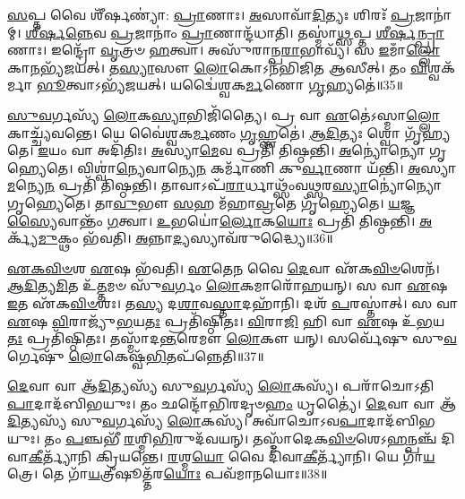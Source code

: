 \-\ul{𑌸}\-𑌪𑍍𑌤 𑌵𑍈 𑌶𑍀᳴𑌰𑍍\mbox{}\-\ul{𑌷}\-𑌣𑍍𑌯𑌾॑: \ul{𑌪𑍍𑌰𑌾}\-𑌣𑌾𑌃।
\-\ul{𑌅}\-𑌸𑌾𑌵𑌾᳴\-\ul{𑌦𑌿}\-𑌤𑍍𑌯𑌃 𑌶𑌿𑌰𑌃᳴ \ul{𑌪𑍍𑌰}\-𑌜𑌾𑌨𑌾॑𑌮𑍍।
\-\ul{𑌶𑍀}\-\-\ul{𑌰𑍍}\-𑌷\-\ul{𑌨𑍍𑌨𑍇}\-𑌵 \ul{𑌪𑍍𑌰}\-𑌜𑌾𑌨𑌾𑌂॑ \ul{𑌪𑍍𑌰𑌾}\-𑌣𑌾𑌨𑍍𑌦᳴𑌧𑌾𑌤𑌿।
𑌤𑌸𑍍𑌮𑌾॑\-\ul{𑌥𑍍𑌸}\-𑌪𑍍𑌤 \ul{𑌶𑍀}\-\-\ul{𑌰𑍍}\-𑌷\-\ul{𑌨𑍍𑌪𑍍𑌰𑌾}\-𑌣𑌾𑌃।
𑌇𑌨𑍍𑌦𑍍𑌰𑍋᳴ \ul{𑌵𑍃}\-𑌤𑍍𑌰𑍞 \ul{𑌹}\-𑌤𑍍𑌵𑌾।
𑌅𑌸𑍁᳴𑌰𑌾𑌨𑍍𑌪\-\ul{𑌰𑌾}\-𑌭𑌾𑌵𑍍𑌯᳴।
𑌸 \ul{𑌇}\-𑌮𑌾𑌁\-\ul{𑌲𑍍𑌲𑍋}\-𑌕𑌾\-\ul{𑌨}\-𑌭𑍍𑌯᳴𑌜𑌯𑌤𑍍।
𑌤\-\ul{𑌸𑍍𑌯𑌾}\-𑌸𑍗 \ul{𑌲𑍋}\-𑌕𑍋\-𑌽𑌨᳴𑌭𑌿𑌜𑌿𑌤 𑌆𑌸𑍀𑌤𑍍।
𑌤𑌂 \ul{𑌵𑌿}\-𑌶𑍍𑌵𑌕᳴𑌰𑍍𑌮𑌾 \ul{𑌭𑍂}\-𑌤𑍍𑌵𑌾\-𑌽𑌭𑍍𑌯᳴𑌜𑌯𑌤𑍍।
𑌯𑌦𑍍𑌵𑍈॑𑌶𑍍𑌵𑌕\-\ul{𑌰𑍍𑌮}\-𑌣𑍋 \ul{𑌗𑍃}\-𑌹𑍍𑌯𑌤𑍇॑॥35॥

\-\ul{𑌸𑍁}\-\-\ul{𑌵}\-𑌰𑍍𑌗𑌸𑍍𑌯᳴ \ul{𑌲𑍋}\-𑌕\-\ul{𑌸𑍍𑌯𑌾}\-𑌭𑌿𑌜𑌿᳴𑌤𑍍𑌯𑍈।
𑌪𑍍𑌰 𑌵𑌾 \ul{𑌏}\-𑌤𑍇॑\-𑌽𑌸𑍍𑌮𑌾\-\ul{𑌲𑍍𑌲𑍋}\-𑌕𑌾𑌚𑍍𑌚𑍍𑌯᳴𑌵𑌨𑍍𑌤𑍇।
𑌯𑍇 𑌵𑍈॑𑌶𑍍𑌵𑌕\-\ul{𑌰𑍍𑌮}\-𑌣𑌂 \ul{𑌗𑍃}\-𑌹𑍍𑌣𑌤𑍇॑।
\-\ul{𑌆}\-\-\ul{𑌦𑌿}\-𑌤𑍍𑌯𑌃 𑌶𑍍𑌵𑍋 𑌗𑍃᳴𑌹𑍍𑌯𑌤𑍇।
\-\ul{𑌇}\-𑌯𑌂 𑌵𑌾 𑌅𑌦𑌿᳴𑌤𑌿𑌃।
\-\ul{𑌅}\-𑌸𑍍𑌯𑌾\-\ul{𑌮𑍇}\-𑌵 𑌪𑍍𑌰𑌤𑌿᳴ 𑌤𑌿𑌷𑍍𑌠𑌨𑍍𑌤𑌿।
\-\ul{𑌅}\-𑌨𑍍𑌯𑍋॑𑌨𑍍𑌯𑍋 𑌗𑍃𑌹𑍍𑌯𑍇𑌤𑍇।
𑌵𑌿𑌶𑍍𑌵𑌾॑\-\ul{𑌨𑍍𑌯𑍇}\-𑌵𑌾𑌨𑍍𑌯𑍇\-\ul{𑌨} 𑌕𑌰𑍍𑌮𑌾᳴𑌣𑌿 𑌕𑍁\-\ul{𑌰𑍍𑌵𑌾}\-𑌣𑌾 𑌯᳴𑌨𑍍𑌤𑌿।
\-\ul{𑌅}\-𑌸𑍍𑌯𑌾\-\ul{𑌮}\-𑌨𑍍𑌯𑍇\-\ul{𑌨} 𑌪𑍍𑌰𑌤𑌿᳴ 𑌤𑌿𑌷𑍍𑌠𑌨𑍍𑌤𑌿।
𑌤𑌾𑌵𑌾𑌽𑌪᳴\-\ul{𑌰𑌾}\-𑌰𑍍𑌧𑌾𑌥𑍍𑌸𑌂᳴𑌵\-\ul{𑌥𑍍𑌸}\-𑌰\-\ul{𑌸𑍍𑌯𑌾}\-𑌨𑍍𑌯𑍋॑𑌨𑍍𑌯𑍋 𑌗𑍃𑌹𑍍𑌯𑍇𑌤𑍇।
𑌤𑌾\-\ul{𑌵𑍁}\-𑌭𑍗 \ul{𑌸}\-𑌹 𑌮᳴𑌹𑌾\-\ul{𑌵𑍍𑌰}\-𑌤𑍇 𑌗𑍃᳴𑌹𑍍𑌯𑍇𑌤𑍇।
\-\ul{𑌯}\-𑌜𑍍𑌞\-\ul{𑌸𑍍𑌯𑍈}\-𑌵𑌾𑌨𑍍𑌤𑌂᳴ \ul{𑌗}\-𑌤𑍍𑌵𑌾।
\-\ul{𑌉}\-𑌭𑌯𑍋॑\-\ul{𑌰𑍍𑌲𑍋}\-𑌕\-\ul{𑌯𑍋𑌃} 𑌪𑍍𑌰𑌤𑌿᳴ 𑌤𑌿𑌷𑍍𑌠𑌨𑍍𑌤𑌿।
\-\ul{𑌅}\-𑌰𑍍𑌕𑍍𑌯᳴\-\ul{𑌮𑍁}\-𑌕𑍍𑌥𑌂 𑌭᳴𑌵𑌤𑌿।
\-\ul{𑌅}\-𑌨𑍍𑌨𑌾\-\ul{𑌦𑍍𑌯}\-𑌸𑍍𑌯𑌾𑌵᳴𑌰𑍁𑌦𑍍𑌧𑍍𑌯𑍈॥36॥\anuvakamend[\-\ul{𑌸}\-\-\ul{𑌮𑌾}\-𑌯𑌚𑍍𑌛᳴𑌤𑍍𑌯𑌤𑌿\-\ul{𑌗𑍍𑌰𑌾}\-𑌹𑍍𑌯𑌾᳴ 𑌗𑍃𑌹𑍍𑌯𑌨𑍍𑌤𑍇 \ul{𑌗𑍃}\-𑌹𑍍𑌯𑌤𑍇᳴ 𑌸𑌂𑌵\-\ul{𑌥𑍍𑌸}\-𑌰\-\ul{𑌸𑍍𑌯𑌾}\-𑌨𑍍𑌯𑍋॑𑌨𑍍𑌯𑍋 𑌗𑍃𑌹𑍍𑌯𑍇\-\ul{𑌤𑍇} 𑌪𑌞𑍍𑌚᳴ 𑌚]

\-\ul{𑌏}\-\-\ul{𑌕}\-\-\ul{𑌵𑌿}\-\-\ul{𑍞}\-𑌶 \ul{𑌏}\-𑌷 𑌭᳴𑌵𑌤𑌿।
\-\ul{𑌏}\-𑌤𑍇\-\ul{𑌨} 𑌵𑍈 \ul{𑌦𑍇}\-𑌵𑌾 𑌏᳴𑌕\-\ul{𑌵𑌿}\-\-\ul{𑍞}\-𑌶𑍇𑌨᳴।
\-\ul{𑌆}\-\-\ul{𑌦𑌿}\-𑌤𑍍𑌯\-\ul{𑌮𑌿}\-𑌤 𑌉᳴\-\ul{𑌤𑍍𑌤}\-𑌮𑍞 𑌸𑍁᳴\-\ul{𑌵}\-𑌰𑍍𑌗𑌂 \ul{𑌲𑍋}\-𑌕𑌮𑌾𑌰𑍋᳴𑌹𑌯𑌨𑍍।
𑌸 𑌵𑌾 \ul{𑌏}\-𑌷 \ul{𑌇}\-𑌤 𑌏᳴𑌕\-\ul{𑌵𑌿}\-\-\ul{𑍞}\-𑌶𑌃।
𑌤\-\ul{𑌸𑍍𑌯} 𑌦\-\ul{𑌶𑌾}\-𑌵\-\ul{𑌸𑍍𑌤𑌾}\-𑌦𑌹𑌾᳴𑌨𑌿।
𑌦𑌶᳴ \ul{𑌪}\-𑌰𑌸𑍍𑌤𑌾॑𑌤𑍍।
𑌸 𑌵𑌾 \ul{𑌏}\-𑌷 \ul{𑌵𑌿}\-𑌰𑌾𑌜𑍍𑌯𑍁᳴\-\ul{𑌭}\-𑌯\-\ul{𑌤𑌃} 𑌪𑍍𑌰𑌤𑌿᳴\-𑌷𑍍𑌠𑌿𑌤𑌃।
\-\ul{𑌵𑌿}\-𑌰𑌾\-\ul{𑌜𑌿} 𑌹𑌿 𑌵𑌾 \ul{𑌏}\-𑌷 𑌉᳴\-\ul{𑌭}\-𑌯\-\ul{𑌤𑌃} 𑌪𑍍𑌰𑌤𑌿᳴\-𑌷𑍍𑌠𑌿𑌤𑌃।
𑌤𑌸𑍍𑌮𑌾᳴𑌦\-\ul{𑌨𑍍𑌤}\-𑌰𑍇𑌮𑍗 \ul{𑌲𑍋}\-𑌕𑍗 𑌯𑌨𑍍।
𑌸𑌰𑍍𑌵𑍇᳴𑌷𑍁 𑌸𑍁\-\ul{𑌵}\-𑌰𑍍𑌗𑍇𑌷𑍁᳴ \ul{𑌲𑍋}\-𑌕𑍇𑌷𑍍𑌵᳴\-\ul{𑌭𑌿}\-𑌤𑌪᳴𑌨𑍍𑌨𑍇𑌤𑌿॥37॥

\-\ul{𑌦𑍇}\-𑌵𑌾 𑌵𑌾 𑌆᳴\-\ul{𑌦𑌿}\-𑌤𑍍𑌯𑌸𑍍𑌯᳴ 𑌸𑍁\-\ul{𑌵}\-𑌰𑍍𑌗𑌸𑍍𑌯᳴ \ul{𑌲𑍋}\-𑌕𑌸𑍍𑌯᳴।
𑌪𑌰𑌾᳴𑌚𑍋\-𑌽𑌤𑌿\-\ul{𑌪𑌾}\-𑌦𑌾\-𑌦᳴𑌬𑌿𑌭𑌯𑍁𑌃।
𑌤𑌂 𑌛𑌨𑍍𑌦𑍋᳴𑌭𑌿𑌰𑌦𑍃𑍞\-\ul{𑌹𑌂} 𑌧𑍃𑌤𑍍𑌯𑍈॑।
\-\ul{𑌦𑍇}\-𑌵𑌾 𑌵𑌾 𑌆᳴\-\ul{𑌦𑌿}\-𑌤𑍍𑌯𑌸𑍍𑌯᳴ 𑌸𑍁\-\ul{𑌵}\-𑌰𑍍𑌗𑌸𑍍𑌯᳴ \ul{𑌲𑍋}\-𑌕𑌸𑍍𑌯᳴।
𑌅𑌵𑌾᳴𑌚𑍋\-𑌽𑌵\-\ul{𑌪𑌾}\-𑌦𑌾𑌦᳴𑌬𑌿𑌭𑌯𑍁𑌃।
𑌤𑌂 \ul{𑌪}\-𑌞𑍍𑌚𑌭𑍀᳴ \ul{𑌰}\-𑌶𑍍𑌮𑌿\-\ul{𑌭𑌿}\-𑌰𑍁𑌦᳴𑌵𑌯𑌨𑍍।
𑌤𑌸𑍍𑌮𑌾᳴𑌦𑍇𑌕\-\ul{𑌵𑌿}\-\-\ul{𑍞}\-𑌶𑍇\-𑌽\-\ul{𑌹}\-𑌨𑍍𑌪𑌞𑍍𑌚᳴ 𑌦𑌿𑌵𑌾\-\ul{𑌕𑍀}\-𑌰𑍍𑌤𑍍𑌯𑌾᳴𑌨𑌿 𑌕𑍍𑌰𑌿𑌯𑌨𑍍𑌤𑍇।
\-\ul{𑌰}\-𑌶𑍍𑌮\-\ul{𑌯𑍋} 𑌵𑍈 𑌦𑌿᳴𑌵𑌾\-\ul{𑌕𑍀}\-𑌰𑍍𑌤𑍍𑌯𑌾᳴𑌨𑌿।
𑌯𑍇 𑌗𑌾᳴\-\ul{𑌯}\-𑌤𑍍𑌰𑍇।
𑌤𑍇 𑌗𑌾᳴\-\ul{𑌯}\-𑌤𑍍𑌰𑍀𑌷𑍂𑌤𑍍𑌤᳴𑌰\-\ul{𑌯𑍋𑌃} 𑌪𑌵᳴𑌮𑌾𑌨𑌯𑍋𑌃॥38॥

